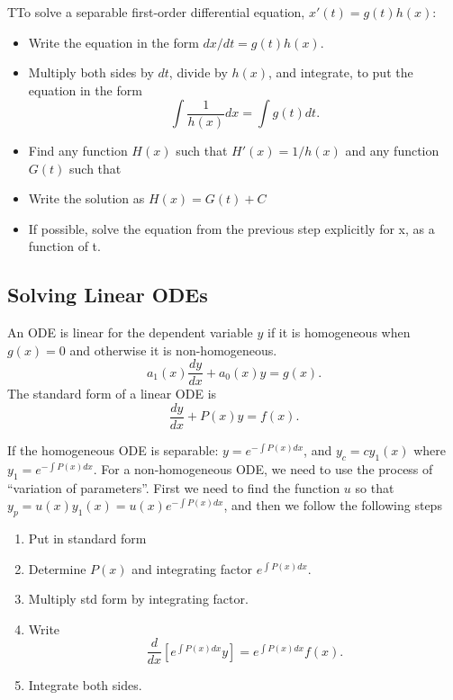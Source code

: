   \begin{theorem}
    TTo solve a separable first-order differential equation, $x'(t)=g(t)h(x)$:
    \begin{itemize}
      \item Write the equation in the form $dx/dt=g(t)h(x)$.
      \item Multiply both sides by $dt$, divide by $h(x)$, and integrate, to put the equation in the form 
        \[
          \int \frac{1}{h(x)}dx =\int g(t)dt.
        \]
      \item Find any function $H(x)$ such that $H'(x)=1/h(x)$ and any function $G(t)$ such that %
      \item Write the solution as $H(x)=G(t)+C$
      \item If possible, solve the equation from the previous step explicitly for x, as a function of t.
    \end{itemize}
  \end{theorem}

\subsection{Solving Linear ODEs}

 \begin{definition}
   An ODE is linear for the dependent variable $y$ if it is homogeneous when $g(x)=0$ and otherwise it is non-homogeneous.
   \[
     a_1(x)\frac{dy}{dx}+a_0(x)y=g(x)
   .\] 
   The standard form of a linear ODE is
   \[
     \frac{dy}{dx}+P(x)y=f(x)
   .\] 
 \end{definition}
 
 If the homogeneous ODE is separable: $y=e^{-\int P(x)dx}$, and $y_c=cy_1(x)$ where $y_1=e^{-\int P(x)dx}$. For a non-homogeneous ODE, we need to use the process of “variation of parameters”. First we need to find the function $u$ so that $y_p=u(x)y_1(x)=u(x)e^{-\int P(x)dx}$, and then we follow the following steps

 \begin{enumerate}
   \item Put in standard form
   \item Determine $P(x)$ and integrating factor $e^{\int P(x)dx}$.
   \item Multiply std form by integrating factor.
   \item Write \[
       \frac{d}{dx}\left[e^{\int P(x)dx}y\right]=e^{\int P(x)dx}f(x)
   .\] 
  \item Integrate both sides.
 \end{enumerate}

